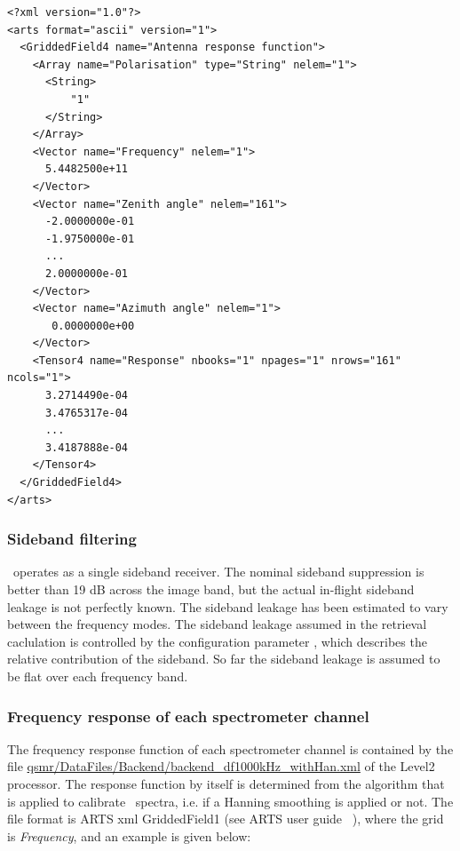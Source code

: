 %
\lstset{language=XML}
\begin{lstlisting}
<?xml version="1.0"?>
<arts format="ascii" version="1">
  <GriddedField4 name="Antenna response function">
    <Array name="Polarisation" type="String" nelem="1">
      <String>
          "1"
      </String>
    </Array>
    <Vector name="Frequency" nelem="1">
      5.4482500e+11
    </Vector>
    <Vector name="Zenith angle" nelem="161">
      -2.0000000e-01
      -1.9750000e-01
      ...
      2.0000000e-01
    </Vector>
    <Vector name="Azimuth angle" nelem="1">     
       0.0000000e+00
    </Vector>
    <Tensor4 name="Response" nbooks="1" npages="1" nrows="161" ncols="1">
      3.2714490e-04
      3.4765317e-04 
      ...
      3.4187888e-04 
    </Tensor4>
  </GriddedField4>
</arts>
\end{lstlisting}

\subsubsection*{Sideband filtering}


\smr\ operates as a single sideband receiver. The nominal sideband suppression
is better than 19 dB across the image band, but the actual in-flight sideband
leakage is not perfectly known. The sideband leakage has been estimated to vary
between the frequency modes. The sideband leakage assumed in the retrieval
caclulation is controlled by the configuration parameter
, which describes the relative contribution of the
sideband. So far the sideband leakage is assumed to be flat over each frequency
band.

\subsubsection*{Frequency response of each spectrometer channel}

The frequency response function of each spectrometer channel is contained by
the file \url{qsmr/DataFiles/Backend/backend\_df1000kHz\_withHan.xml} of the
Level2 processor. The response function by itself is determined from the
algorithm that is applied to calibrate \smr\ spectra, i.e. if a Hanning
smoothing is applied or not. The file format is ARTS xml GriddedField1 (see
ARTS user guide ~\citep{artsug}), where the grid is \emph{Frequency}, and an
example is given below:

